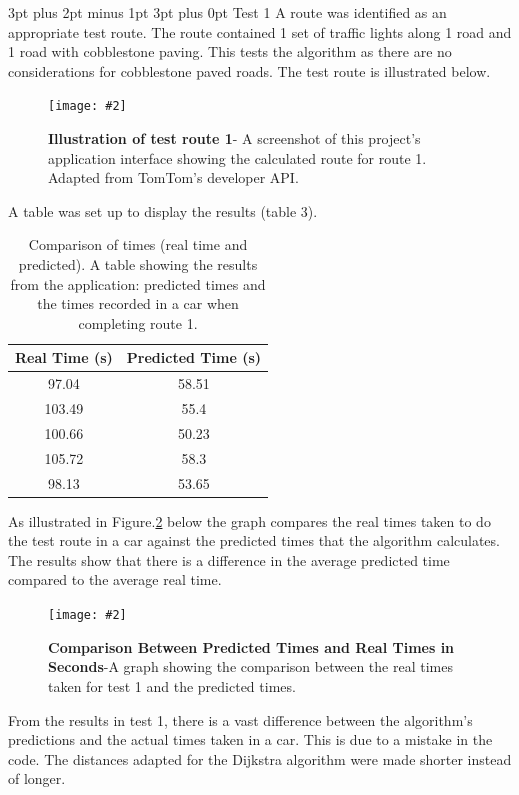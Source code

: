 \documentclass[12pt,a4paper]{article}
\makeatletter
\newcommand{\figuremacro}[5]{
    \begin{figure}[#1]
        \centering
        \texttt{[image: \#2]}
        \caption[#3]{\textbf{#3}#4}
        \label{fig:#2}
    \end{figure}
}
\renewcommand\subsection{\@startsection {subsection}{1}{0mm} %
                               {3pt plus 2pt minus 1pt} %
                               {3pt plus 0pt} %
                               {\normalfont\bfseries}}
\makeatother
\begin{document}
\subsection{Test 1}
A route was identified as an appropriate test route. The route contained 1 set of traffic lights along 1 road and 1 road with cobblestone paving. This tests the algorithm as there are no considerations for cobblestone paved roads. The test route is illustrated below.

\figuremacro{h}{testRoute1}{Illustration of test route 1}{- A screenshot of this project's application interface showing the calculated route for route 1. Adapted from TomTom's developer API\cite{TomTomMapAPI}.}{0.35}

A table was set up to display the results (table 3).

\begin{table}[ht]
	\centering
	\caption{Comparison of times (real time and predicted). A table showing the results from the application: predicted times and the times recorded in a car when completing route 1.}
	\begin{tabular}{@{}cc@{}}
		\toprule
		Real Time (s) & Predicted Time (s) \\ \midrule
		97.04         & 58.51              \\
		103.49        & 55.4               \\
		100.66        & 50.23              \\
		105.72        & 58.3               \\
		98.13         & 53.65              \\ \bottomrule
	\end{tabular}
\end{table}

As illustrated in Figure.\ref{fig:graph1} below the graph compares the real times taken to do the test route in a car against the predicted times that the algorithm calculates. The results show that there is a difference in the average predicted time compared to the average real time.

\figuremacro{ht}{graph1}{Comparison Between Predicted Times and Real Times in Seconds}{-A graph showing the comparison between the real times taken for test 1 and the predicted times.}{0.8}

From the results in test 1, there is a vast difference between the algorithm's predictions and the actual times taken in a car. This is due to a mistake in the code. The distances adapted for the Dijkstra algorithm were made shorter instead of longer.
\newpage
\end{document}
